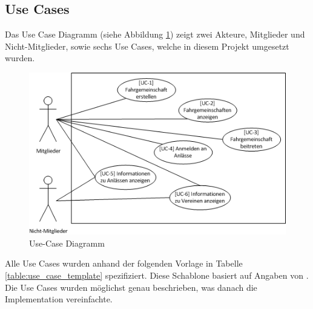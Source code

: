 \subsection{Use Cases}\label{use_cases}
Das Use Case Diagramm (siehe Abbildung \ref{fig:use_case}) zeigt zwei Akteure, Mitglieder und Nicht-Mitglieder, sowie sechs Use Cases, welche in diesem Projekt umgesetzt wurden.
\begin{figure}[h]
\includegraphics{images/anforderungen/use_cases.png}
\caption{Use-Case Diagramm}
\label{fig:use_case}
\end{figure}

Alle Use Cases wurden anhand der folgenden Vorlage in Tabelle \ref{table:use_case_template} spezifiziert. Diese Schablone basiert auf Angaben von \cite{req_eng_book}. Die Use Cases wurden möglichst genau beschrieben, was danach die Implementation vereinfachte.


